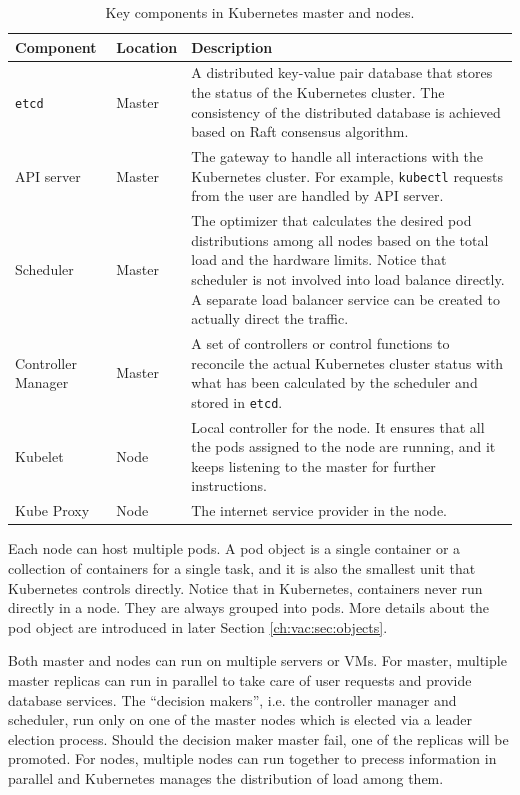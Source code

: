 \begin{table}[!htb]
	\centering
	\caption{Key components in Kubernetes master and nodes.} \label{ch:vac:tab:keycomponents}
	\begin{tabularx}{\textwidth}{llX}
		\hline
		Component & Location & Description \\
		\hline
		\verb|etcd| & Master & A distributed key-value pair database that stores the status of the Kubernetes cluster. The consistency of the distributed database is achieved based on Raft consensus algorithm. \\ \hline
		API server & Master & The gateway to handle all interactions with the Kubernetes cluster. For example, \verb|kubectl| requests from the user are handled by API server. \\ \hline
		Scheduler & Master & The optimizer that calculates the desired pod distributions among all nodes based on the total load and the hardware limits. Notice that scheduler is not involved into load balance directly. A separate load balancer service can be created to actually direct the traffic. \\ \hline
		Controller Manager & Master & A set of controllers or control functions to reconcile the actual Kubernetes cluster status with what has been calculated by the scheduler and stored in \verb|etcd|. \\ \hline
		Kubelet & Node & Local controller for the node. It ensures that all the pods assigned to the node are running, and it keeps listening to the master for further instructions. \\ \hline
		Kube Proxy & Node & The internet service provider in the node. \\
		\hline
	\end{tabularx}
\end{table}

Each node can host multiple pods. A pod object is a single container or a collection of containers for a single task, and it is also the smallest unit that Kubernetes controls directly. Notice that in Kubernetes, containers never run directly in a node. They are always grouped into pods. More details about the pod object are introduced in later Section \ref{ch:vac:sec:objects}.

Both master and nodes can run on multiple servers or VMs. For master, multiple master replicas can run in parallel to take care of user requests and provide database services. The ``decision makers'', i.e. the controller manager and scheduler, run only on one of the master nodes which is elected via a leader election process. Should the decision maker master fail, one of the replicas will be promoted. For nodes, multiple nodes can run together to precess information in parallel and Kubernetes manages the distribution of load among them.


